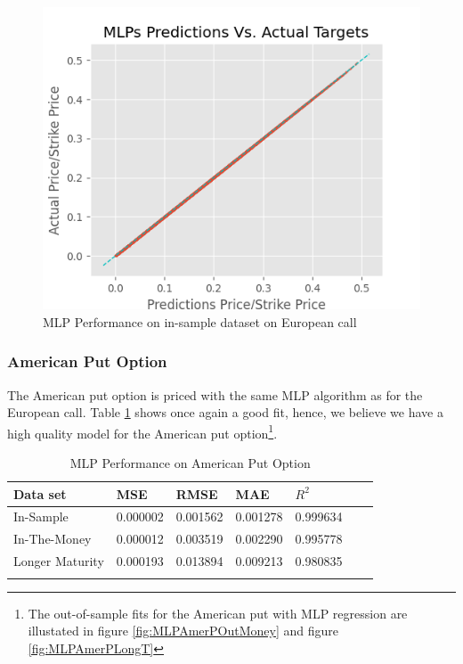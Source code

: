 \begin{figure}[th]
\centering
\includegraphics{Figures/PredictionEuroC.png}
\decoRule
\caption[MLP Performance for In-sample Dataset European Call]{MLP Performance on in-sample dataset on European call}
\label{fig:MLPInSampleEuroC}
\end{figure}


\subsubsection{American Put Option}
The American put option is priced with the same MLP algorithm as for the European call. Table \ref{tab:AmerPerformanceComparision} shows once again a good fit, hence, we believe we have a high quality model for the American put option\footnote{The out-of-sample fits for the American put with MLP regression are illustated in figure \ref{fig:MLPAmerPOutMoney} and figure \ref{fig:MLPAmerPLongT}}.

\begin{table}[th]
\caption{MLP Performance on American Put Option}
\label{tab:AmerPerformanceComparision}
\centering
\begin{tabular}{l l l l l l l }
\toprule
\textbf{Data set} & \textbf{MSE} & \textbf{RMSE} & \textbf{MAE} & \textbf{$R^2$} \\
\midrule
In-Sample & 0.000002 & 0.001562 & 0.001278 & 0.999634\\
In-The-Money & 0.000012 & 0.003519 & 0.002290 & 0.995778\\
Longer Maturity & 0.000193 & 0.013894 & 0.009213 & 0.980835\\
\bottomrule\\
\end{tabular}
\end{table}

